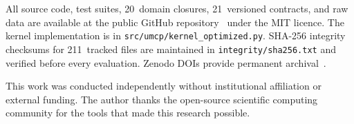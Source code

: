 \documentclass[
  aps,
  prx,
  twocolumn,
  superscriptaddress,
  nofootinbib,
  floatfix
]{revtex4-2}
\begin{document}
All source code, test suites, 20~domain closures, 21~versioned
contracts, and raw data are available at the public GitHub
repository~\cite{umcpmetadatarepo} under the MIT licence. The
kernel implementation is in
\texttt{src/umcp/kernel\_optimized.py}. SHA-256 integrity checksums
for 211~tracked files are maintained in \texttt{integrity/sha256.txt}
and verified before every evaluation. Zenodo DOIs provide permanent
archival~\cite{paulus2025episteme,
paulus2025physicscoherence, paulus2026umcpcasepack}.

\begin{acknowledgments}
This work was conducted independently without institutional
affiliation or external funding. The author thanks the open-source
scientific computing community for the tools that made this
research possible.
\end{acknowledgments}


\end{document}
